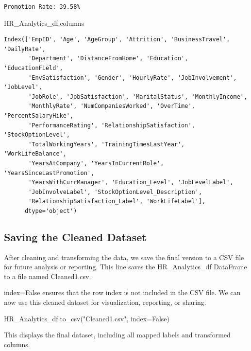 \documentclass[
  letterpaper,
  DIV=11,
  numbers=noendperiod]{scrartcl}
\newenvironment{Shaded}{\begin{snugshade}}{\end{snugshade}}
\newcommand{\NormalTok}[1]{\textcolor[rgb]{0.00,0.23,0.31}{#1}}
\newcommand{\OperatorTok}[1]{\textcolor[rgb]{0.37,0.37,0.37}{#1}}
\newcommand{\StringTok}[1]{\textcolor[rgb]{0.13,0.47,0.30}{#1}}
\newcommand{\VariableTok}[1]{\textcolor[rgb]{0.07,0.07,0.07}{#1}}
\begin{document}
\begin{verbatim}
Promotion Rate: 39.58%
\end{verbatim}

\begin{Shaded}
\begin{Highlighting}[]
\NormalTok{HR\_Analytics\_df.columns}
\end{Highlighting}
\end{Shaded}

\begin{verbatim}
Index(['EmpID', 'Age', 'AgeGroup', 'Attrition', 'BusinessTravel', 'DailyRate',
       'Department', 'DistanceFromHome', 'Education', 'EducationField',
       'EnvSatisfaction', 'Gender', 'HourlyRate', 'JobInvolvement', 'JobLevel',
       'JobRole', 'JobSatisfaction', 'MaritalStatus', 'MonthlyIncome',
       'MonthlyRate', 'NumCompaniesWorked', 'OverTime', 'PercentSalaryHike',
       'PerformanceRating', 'RelationshipSatisfaction', 'StockOptionLevel',
       'TotalWorkingYears', 'TrainingTimesLastYear', 'WorkLifeBalance',
       'YearsAtCompany', 'YearsInCurrentRole', 'YearsSinceLastPromotion',
       'YearsWithCurrManager', 'Education_Level', 'JobLevelLabel',
       'JobInvolveLabel', 'StockOptionLevel_Description',
       'RelationshipSatisfaction_Label', 'WorkLifeLabel'],
      dtype='object')
\end{verbatim}

\subsection{Saving the Cleaned
Dataset}\label{saving-the-cleaned-dataset}

After cleaning and transforming the data, we save the final version to a
CSV file for future analysis or reporting. This line saves the
HR\_Analytics\_df DataFrame to a file named Cleaned1.csv.

index=False ensures that the row index is not included in the CSV file.
We can now use this cleaned dataset for visualization, reporting, or
sharing.

\begin{Shaded}
\begin{Highlighting}[]
\NormalTok{HR\_Analytics\_df.to\_csv(}\StringTok{"Cleaned1.csv"}\NormalTok{, index}\OperatorTok{=}\VariableTok{False}\NormalTok{)}
\end{Highlighting}
\end{Shaded}

This displays the final dataset, including all mapped labels and
transformed columns.
\end{document}
